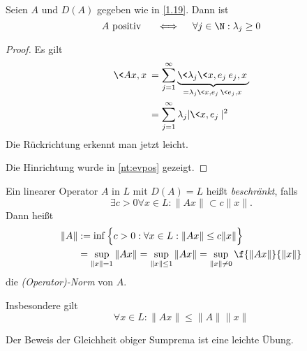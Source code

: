 \documentclass{mycourse}
\begin{document}
\begin{nt} \label{1.22}
	Seien $A$ und $D(A)$ gegeben wie in \ref{1.19}.
	Dann ist
	\[
		A \text{ positiv }  \quad\iff\quad \forall j\in \N : \lambda_j \ge 0
	\]
	\begin{proof}
		Es gilt
		\begin{align*}
			\<Ax, x \> 
			&= \sum_{j=1}^\infty \underbrace{\<\lambda_j \<x,e_j\> e_j, x\>}_{= \lambda_j\<x,e_j\> \<e_j,x\>} \\
			&= \sum_{j=1}^\infty \lambda_j |\<x,e_j\>|^2
		\end{align*}
		Die Rückrichtung erkennt man jetzt leicht.

		Die Hinrichtung wurde in \ref{nt:evpos} gezeigt.
	\end{proof}
\end{nt}

\begin{df} \label{1.23}
	Ein linearer Operator $A$ in $L$ mit $D(A) = L$ heißt \emph{beschränkt}, falls
	\[
		\exists c > 0 \forall x \in L : \|Ax\| \subset c\|x\|.
	\]
	Dann heißt
	\begin{align*}
		\|A\| &:= \inf \Big\{ c > 0 : \forall x \in L : \|Ax\| \le c\|x\| \Big\} \\
		&= \sup_{\|x\|=1} \|Ax\| = \sup_{\|x\|\le 1} \|Ax\| = \sup_{\|x\|\neq 0} \f{\|Ax\|}{\|x\|}
	\end{align*}
	die \emph{(Operator)-Norm} von $A$.

	Insbesondere gilt
	\[
		\forall x\in L : \|Ax\| \le \|A\| \|x\|
	\]
	\begin{note}
		Der Beweis der Gleichheit obiger Sumprema ist eine leichte Übung.
	\end{note}
\end{df}
\end{document}
